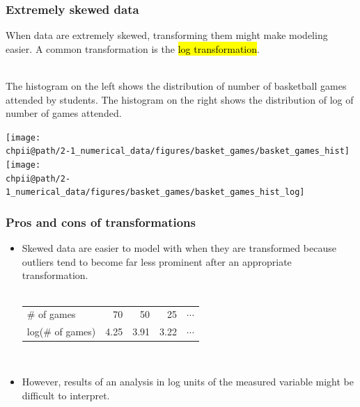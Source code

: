 \documentclass[slidestop,compress,mathserif]{beamer}
\makeatletter
\newcommand{\soln}[1]{\textit{#1}}
\def\chpii@path{../../Chp 2}
\makeatother
\begin{document}
\begin{frame}
\frametitle{Extremely skewed data}

When data are extremely skewed, transforming them might make modeling easier. A common transformation is the \hl{log transformation}.

$\:$ \\
\pause
The histogram on the left shows the distribution of number of basketball games attended by students. The histogram on the right shows the distribution of log of number of games attended.

\begin{center}
\texttt{[image: \\chpii@path/2-1\_numerical\_data/figures/basket\_games/basket\_games\_hist]}
\texttt{[image: \\chpii@path/2-1\_numerical\_data/figures/basket\_games/basket\_games\_hist\_log]}
\end{center}

\end{frame}


\begin{frame}
\frametitle{Pros and cons of transformations}

\begin{itemize}

\item Skewed data are easier to model with when they are transformed because outliers tend to become far less prominent after an appropriate transformation. \\
$\:$ \\
\renewcommand{\arraystretch}{1.5}
\begin{tabular}{l r r r r }
\# of games		&  70 	& 50 		& 25 		 		& $\cdots$ \\
log(\# of games)	& 4.25	& 3.91 	& 3.22 	 	& $\cdots$
\end{tabular}

$\:$ \\

\item However, results of an analysis in log units of the measured variable might be difficult to interpret.

\end{itemize}

\pause


\soln{}

\end{frame}
\end{document}
